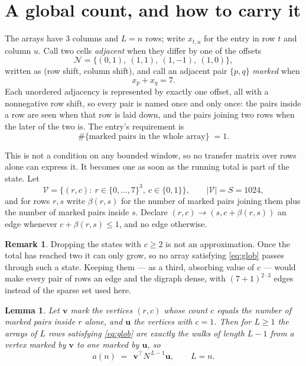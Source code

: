 \documentclass[11pt,a4paper]{article}
\theoremstyle{plain}
\newtheorem{lemma}[theorem]{Lemma}
\theoremstyle{definition}
\newtheorem{remark}[theorem]{Remark}
\begin{document}
\section{A global count, and how to carry it}

The arrays have $3$ columns and $L=n$ rows; write $x_{t,u}$ for the entry in
row $t$ and column $u$. Call two cells \emph{adjacent} when they differ by one of the
offsets
\[
\mathcal N=\{(0,1),\ (1,1),\ (1,-1),\ (1,0)\},
\]
written as (row shift, column shift), and call an adjacent pair $\{p,q\}$
\emph{marked} when
\[
x_{p}+x_{q}=7 .
\]
Each unordered adjacency is represented by exactly one offset, all with a nonnegative row
shift, so every pair is named once and only once: the pairs inside a row are seen when
that row is laid down, and the pairs joining two rows when the later of the two is. The
entry's requirement is
\begin{equation}\label{eq:glob}
\#\{\text{marked pairs in the whole array}\}\;=1.
\end{equation}

This is not a condition on any bounded window, so no transfer matrix over rows alone can
express it. It becomes one as soon as the running total is part of the state. Let
\[
\mathcal V=\bigl\{(r,c):\ r\in\{0,\dots,7\}^{3},\ c\in\{0,1\}\bigr\},
\qquad |\mathcal V|=S=1024,
\]
and for rows $r,s$ write $\beta(r,s)$ for the number of marked pairs joining them plus the
number of marked pairs inside $s$. Declare $(r,c)\to(s,c+\beta(r,s))$ an edge whenever
$c+\beta(r,s)\le1$, and no edge otherwise.

\begin{remark}
Dropping the states with $c\ge2$ is not an approximation. Once the total has reached two it
can only grow, so no array satisfying \eqref{eq:glob} passes through such a state. Keeping
them --- as a third, absorbing value of $c$ --- would make every pair of rows an edge and
the digraph dense, with $(7+1)^{2\cdot3}$ edges instead of the sparse set used here.
\end{remark}

\begin{lemma}\label{lem:walk}
Let $\mathbf{v}$ mark the vertices $(r,c)$ whose count $c$ equals the number of marked pairs
inside $r$ alone, and $\mathbf{u}$ the vertices with $c=1$. Then for $L\ge1$ the arrays
of $L$ rows satisfying \eqref{eq:glob} are exactly the walks of length $L-1$ from a
vertex marked by $\mathbf{v}$ to one marked by $\mathbf{u}$, so
\[
a(n)\;=\;\,\mathbf{v}^{\!\top}N^{\,L-1}\mathbf{u},\qquad L=n .
\]
\end{lemma}
\end{document}

